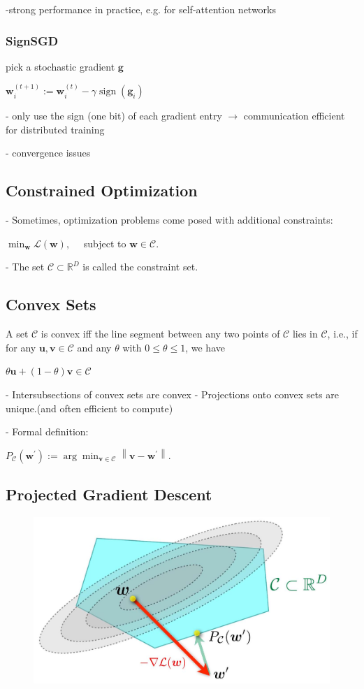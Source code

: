 -strong performance in practice, e.g. for self-attention networks


\subsubsection*{SignSGD}
pick a stochastic gradient $\mathbf{g}$

$
\mathbf{w}_{i}^{(t+1)}:=\mathbf{w}_{i}^{(t)}-\gamma \operatorname{sign}\left(\mathbf{g}_{i}\right)
$

- only use the sign (one bit) of each gradient entry $\rightarrow$ communication efficient for distributed training

- convergence issues

\subsection*{Constrained Optimization}
- Sometimes, optimization problems come posed with additional constraints:

$\min _{\mathbf{w}} \mathcal{L}(\mathbf{w}), \quad$ subject to $\mathbf{w} \in \mathcal{C}$.

- The set $\mathcal{C} \subset \mathbb{R}^{D}$ is called the constraint set.

\subsection*{Convex Sets}
A set $\mathcal{C}$ is convex iff the line segment between any two points of $\mathcal{C}$ lies in $\mathcal{C}$, i.e., if for any $\mathbf{u}, \mathbf{v} \in \mathcal{C}$ and any $\theta$ with $0 \leq \theta \leq 1$, we have

$
\theta \mathbf{u}+(1-\theta) \mathbf{v} \in \mathcal{C}
$

- Intersubsections of convex sets are convex
- Projections onto convex sets are unique.(and often efficient to compute)

- Formal definition:

$P_{\mathcal{C}}\left(\mathbf{w}^{\prime}\right):=\arg \min _{\mathbf{v} \in \mathcal{C}}\left\|\mathbf{v}-\mathbf{w}^{\prime}\right\|$.

\subsection*{Projected Gradient Descent}

\begin{figure} 
    \centering
    \includegraphics*[width=0.3\columnwidth]{figures/PGD.jpg}
    \vspace{-10pt}
\end{figure}

